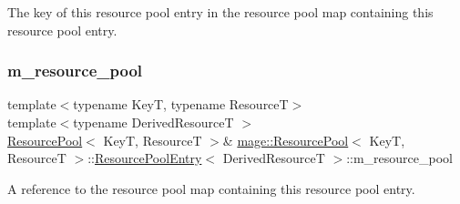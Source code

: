 The key of this resource pool entry in the resource pool map containing this resource pool entry. \hypertarget{structmage_1_1_resource_pool_1_1_resource_pool_entry_a657a97767707dbb045f49440dff4c126}{}\label{structmage_1_1_resource_pool_1_1_resource_pool_entry_a657a97767707dbb045f49440dff4c126} 
\subsubsection{\texorpdfstring{m\+\_\+resource\+\_\+pool}{m\_resource\_pool}}
{\footnotesize\ttfamily template$<$typename KeyT, typename ResourceT$>$ \\
template$<$typename Derived\+ResourceT $>$ \\
\hyperlink{classmage_1_1_resource_pool}{Resource\+Pool}$<$ KeyT, ResourceT $>$\& \hyperlink{classmage_1_1_resource_pool}{mage\+::\+Resource\+Pool}$<$ KeyT, ResourceT $>$\+::\hyperlink{structmage_1_1_resource_pool_1_1_resource_pool_entry}{Resource\+Pool\+Entry}$<$ Derived\+ResourceT $>$\+::m\+\_\+resource\+\_\+pool\hspace{0.3cm}{\ttfamily [private]}}

A reference to the resource pool map containing this resource pool entry. 
